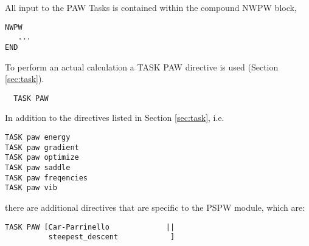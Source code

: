 All input to the PAW Tasks is contained within the compound NWPW block,
\begin{verbatim}
NWPW
   ...
END
\end{verbatim}


To perform an actual calculation a TASK PAW directive is used
(Section \ref{sec:task}).  
\begin{verbatim}
  TASK PAW
\end{verbatim} 
In addition to the directives listed in Section \ref{sec:task}, i.e.
\begin{verbatim}
TASK paw energy          
TASK paw gradient         
TASK paw optimize         
TASK paw saddle           
TASK paw freqencies       
TASK paw vib
\end{verbatim}
there are additional directives that are specific to the PSPW module, which are:
\begin{verbatim}
TASK PAW [Car-Parrinello             ||
          steepest_descent            ]
\end{verbatim}


